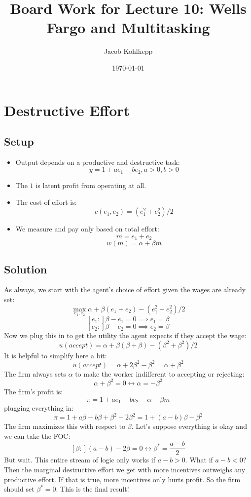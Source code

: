 \documentclass{article}
\title{Board Work for Lecture 10: Wells Fargo and Multitasking}
\author{Jacob Kohlhepp}
\date{\today}
\begin{document}
\maketitle


\section{Destructive Effort}

\subsection{Setup}
\begin{itemize}
    \item Output depends on a productive and destructive task:
    \[y = 1+  ae_1 -b e_2, a>0, b>0\]
    \item The $1$ is latent profit from operating at all.
    \item The cost of effort is:
    \[c(e_1, e_2) = (e_1^2+e_2^2)/2 \]
    \item We measure and pay only based on total effort:
    \[m=e_1+e_2\]
    \[w(m)=\alpha + \beta m\]
\end{itemize}

\subsection{Solution}

As always, we start with the agent's choice of effort given the wages are already set:
\[\max_{e_1, e_2} \alpha + \beta (e_1+e_2)-(e_1^2+e_2^2)/2 \]
\[[e_1:] \beta -e_1=0 \implies e_1=\beta \]
\[[e_2:] \beta -e_2=0 \implies e_2=\beta \]
Now we plug this in to get the utility the agent expects if they accept the wage:
\[u(accept) = \alpha + \beta (\beta +\beta)-(\beta^2+\beta^2)/2\]
It is helpful to simplify here a bit:
\[u(accept) = \alpha + 2\beta^2-\beta^2= \alpha + \beta^2\]
The firm always sets $\alpha$ to make the worker indifferent to accepting or rejecting:
\[\alpha + \beta^2=0 \leftrightarrow \alpha = -\beta^2\]
The firm's profit is:
\[\pi = 1+  ae_1 -b e_2 -\alpha -\beta m\]
plugging everything in:
\[\pi = 1+  a\beta -b \beta +\beta^2 -2\beta^2=1+  (a-b) \beta -\beta^2\]
The firm maximizes this with respect to $\beta$. Let's suppose everything is okay and we can take the FOC:
\[[\beta:] (a-b) -2\beta=0 \leftrightarrow \beta^*= \frac{a-b}{2}\]
But wait. This entire stream of logic only works if $a-b>0$. What if $a-b<0$? Then the marginal destructive effort we get with more incentives outweighs any productive effort. If that is true, more incentives only hurts profit. So the firm should set $\beta^* =0$. This is the final result!
\end{document}
